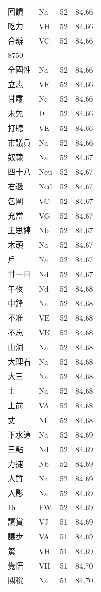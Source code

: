 \documentclass[twocolumn]{book}
\begin{document}
\begin{supertabular}{llrr}
回饋 & Na & 52 &  84.66\\
吃力 & VH & 52 &  84.66\\
合辦 & VC & 52 &  84.66\\
8750\\
全國性 & Na & 52 &  84.66\\
立志 & VF & 52 &  84.66\\
甘肅 & Nc & 52 &  84.66\\
未免 & D & 52 &  84.66\\
打聽 & VE & 52 &  84.66\\
市議員 & Na & 52 &  84.66\\
奴隸 & Na & 52 &  84.67\\
四十八 & Neu & 52 &  84.67\\
右邊 & Ncd & 52 &  84.67\\
包圍 & VC & 52 &  84.67\\
充當 & VG & 52 &  84.67\\
王思婷 & Nb & 52 &  84.67\\
木頭 & Na & 52 &  84.67\\
戶 & Na & 52 &  84.67\\
廿一日 & Nd & 52 &  84.67\\
午夜 & Nd & 52 &  84.68\\
中鋒 & Na & 52 &  84.68\\
不准 & VE & 52 &  84.68\\
不忘 & VK & 52 &  84.68\\
山洞 & Na & 52 &  84.68\\
大理石 & Na & 52 &  84.68\\
大三 & Na & 52 &  84.68\\
士 & Na & 52 &  84.68\\
上前 & VA & 52 &  84.68\\
丈 & Nf & 52 &  84.68\\
下水道 & Na & 52 &  84.69\\
三點 & Nd & 52 &  84.69\\
力捷 & Nb & 52 &  84.69\\
人質 & Na & 52 &  84.69\\
人影 & Na & 52 &  84.69\\
Dr & FW & 52 &  84.69\\
讚賞 & VJ & 51 &  84.69\\
讓步 & VA & 51 &  84.69\\
驚 & VH & 51 &  84.69\\
覺悟 & VH & 51 &  84.70\\
關稅 & Na & 51 &  84.70\\

\end{supertabular}
\end{document}
